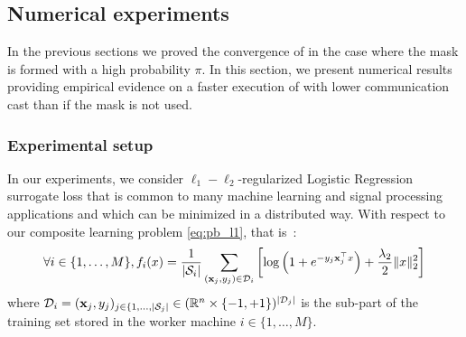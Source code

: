 \subsection{Numerical experiments}\label{sec:exps}
In the previous sections we proved the convergence of \SP{} in the case where the mask is formed with a high probability $\pi$. In this section, we present numerical results providing empirical evidence on a faster execution of \SP{} with lower communication cast than if the mask is not used.




\subsubsection{Experimental setup}


In our experiments, we consider $\ell_1-\ell_2$-regularized Logistic Regression surrogate loss that is common to many machine learning and signal processing applications and which can be minimized in a distributed way. With respect to our composite learning problem \eqref{eq:pb_l1}, that is~:
\begin{equation}\label{eq:log_reg}
    \forall i\in\{1,\ldots,M\}, f_i(x)= \frac{1}{|\mathcal{S}_i|}\sum_{(\mathbf{x}_j,y_j)\in \mathcal{D}_i}\left[\log\left(1 + e^{-y_j\mathbf{x}_j^\top x}\right) + \frac{\lambda_2}{2}\|x\|_2^2 \right]
\end{equation}
where $\mathcal{D}_i=(\mathbf{x}_j,y_j)_{j\in\{1,\ldots,|\mathcal{S}_j|}\in (\mathbb{R}^n\times \{-1,+1\})^{|\mathcal{D}_j|}$ is the sub-part of the training set stored in the worker machine $i\in\{1,\ldots,M\}$. %



